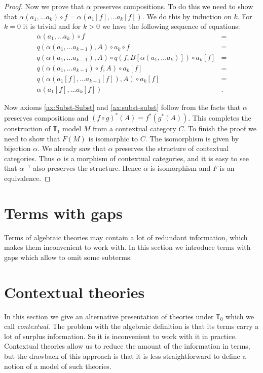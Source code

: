 \documentclass[reqno]{amsart}
\theoremstyle{definition}
\theoremstyle{remark}
\numberwithin{figure}{section}
\begin{document}
\begin{proof}
Now we prove that $\alpha$ preserves compositions.
To do this we need to show that $\alpha(a_1, \ldots a_k) \circ f = \alpha(a_1[f], \ldots a_k[f])$.
We do this by induction on $k$.
For $k = 0$ it is trivial and for $k > 0$ we have the following sequence of equations:
\begin{align*}
\alpha(a_1, \ldots a_k) \circ f & = \\
q(\alpha(a_1, \ldots a_{k-1}), A) \circ a_k \circ f & = \\
q(\alpha(a_1, \ldots a_{k-1}), A) \circ q(f, B[\alpha(a_1, \ldots a_k)]) \circ a_k[f] & = \\
q(\alpha(a_1, \ldots a_{k-1}) \circ f, A) \circ a_k[f] & = \\
q(\alpha(a_1[f], \ldots a_{k-1}[f]), A) \circ a_k[f] & = \\
\alpha(a_1[f], \ldots a_k[f]) & .
\end{align*}

Now axioms \eqref{ax:Subst-Subst} and \eqref{ax:subst-subst} follow from the facts that $\alpha$ preserves compositions and $(f \circ g)^*(A) = f^*(g^*(A))$.
This completes the construction of $\mathbb{T}_1$ model $M$ from a contextual category $C$.
To finish the proof we need to show that $F(M)$ is isomorphic to $C$.
The isomorphism is given by bijection $\alpha$.
We already saw that $\alpha$ preserves the structure of contextual categories.
Thus $\alpha$ is a morphism of contextual categories, and it is easy to see that $\alpha^{-1}$ also preserves the structure.
Hence $\alpha$ is isomorphism and $F$ is an equivalence.
\end{proof}

\section{Terms with gaps}

Terms of algebraic theories may contain a lot of redundant information, which makes them inconvenient to work with.
In this section we introduce terms with gaps which allow to omit some subterms.

\section{Contextual theories}

In this section we give an alternative presentation of theories under $\mathbb{T}_0$ which we call \emph{contextual}.
The problem with the algebraic definition is that its terms carry a lot of surplus information.
So it is inconvenient to work with it in practice.
Contextual theories allow us to reduce the amount of the information in terms,
but the drawback of this approach is that it is less straightforward to define a notion of a model of such theories.
\end{document}
